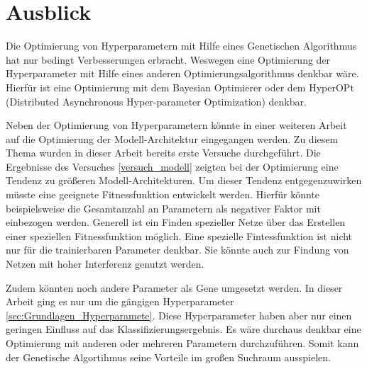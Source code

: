 \section{Ausblick} \label{ausblick}
Die Optimierung von Hyperparametern mit Hilfe eines Genetischen Algorithmus hat nur bedingt Verbesserungen erbracht. Weswegen eine Optimierung der Hyperparameter mit Hilfe eines anderen Optimierungsalgorithmus denkbar wäre. Hierfür ist eine Optimierung mit dem Bayesian Optimierer oder dem HyperOPt (Distributed Asynchronous Hyper-parameter Optimization) denkbar. 

Neben der Optimierung von Hyperparametern könnte in einer weiteren Arbeit auf die Optimierung der Modell-Architektur eingegangen werden. Zu diesem Thema wurden in dieser Arbeit bereits erste Versuche durchgeführt. Die Ergebnisse des Versuches \ref{versuch_modell} zeigten bei der Optimierung eine Tendenz zu größeren Modell-Architekturen. Um dieser Tendenz entgegenzuwirken müsste eine geeignete Fitnessfunktion entwickelt werden. Hierfür könnte beispielsweise die Gesamtanzahl an Parametern als negativer Faktor mit einbezogen werden. Generell ist ein Finden spezieller Netze über das Erstellen einer speziellen Fitnessfunktion möglich. Eine spezielle Fintessfunktion ist nicht nur für die trainierbaren Parameter denkbar. Sie könnte auch zur Findung von Netzen mit hoher Interferenz genutzt werden. 

Zudem könnten noch andere Parameter als Gene umgesetzt werden. In dieser Arbeit ging es nur um die gängigen Hyperparameter \ref{sec:Grundlagen_Hyperparamete}. Diese Hyperparameter haben aber nur einen geringen Einfluss auf das Klassifizierungsergebnis. Es wäre durchaus denkbar eine Optimierung mit anderen oder mehreren Parametern durchzuführen. Somit kann der Genetische Algortihmus seine Vorteile im großen Suchraum ausspielen.
